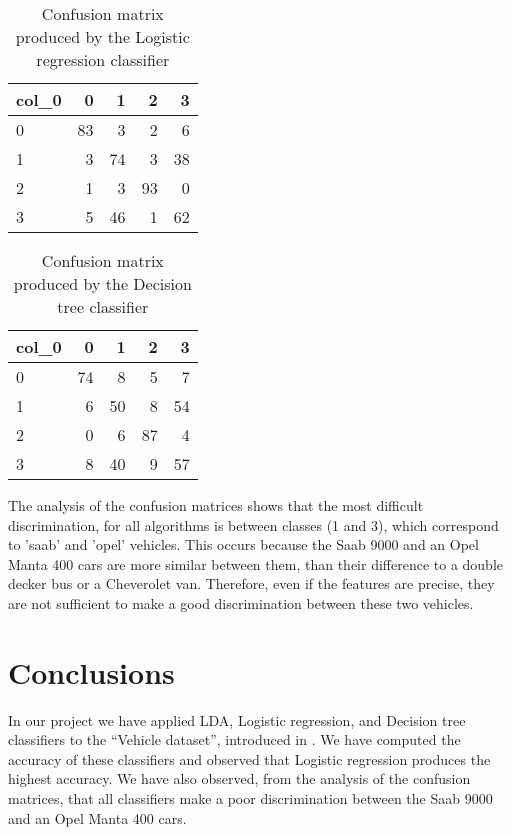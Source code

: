 \documentclass{article} %
\begin{document}
\begin{table}
\centering
\begin{tabular}{lrrrr}
\toprule\hline
col\_0 &   0 &   1 &   2 &   3 \\\hline
0     &  83 &   3 &   2 &   6 \\\hline
1     &   3 &  74 &   3 &  38 \\\hline
2     &   1 &   3 &  93 &   0 \\\hline
3     &   5 &  46 &   1 &  62 \\\hline
\bottomrule \hline
\end{tabular}
\caption{Confusion matrix produced by the Logistic regression classifier}
 \label{tab:CM_LG}
\end{table}

\begin{table}
\centering
\begin{tabular}{lrrrr}
\toprule \hline
col\_0 &   0 &   1 &   2 &   3 \\\hline
0     &  74 &   8 &   5 &   7 \\\hline
1     &   6 &  50 &   8 &  54 \\\hline
2     &   0 &   6 &  87 &   4 \\\hline
3     &   8 &  40 &   9 &  57 \\\hline
\bottomrule \hline
\end{tabular}
\caption{Confusion matrix produced by the Decision tree classifier}
 \label{tab:CM_DT}
\end{table}

The analysis of the confusion matrices shows that the most difficult discrimination, for all algorithms is between classes (1 and 3), which correspond to 'saab' and 'opel' vehicles. This occurs because the Saab 9000 and an Opel Manta 400 cars are more similar between them, than their difference to  a double decker bus or a  Cheverolet van. Therefore, even if the features are precise, they are not sufficient to make a good discrimination between these two vehicles. 

\section{Conclusions}
  In our project we have applied  LDA, Logistic regression, and Decision tree classifiers  to the ``Vehicle dataset'', introduced in \cite{Siebert:1987}. We have computed the accuracy of these classifiers and observed that Logistic regression produces the highest accuracy. We have also observed, from the analysis of the confusion matrices, that all classifiers make a poor discrimination between the Saab 9000 and an Opel Manta 400 cars. 


 
 
\end{document}
